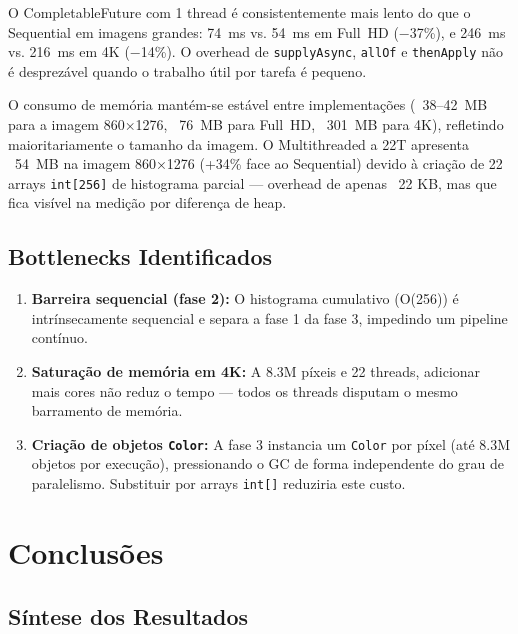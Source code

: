 \documentclass[a4paper,11pt,openright,BCOR=15mm]{scrbook}
\begin{document}
O CompletableFuture com 1 thread é consistentemente mais lento do que o Sequential em imagens grandes: 74~ms vs. 54~ms em Full~HD ($-$37\%), e 246~ms vs. 216~ms em 4K ($-$14\%). O overhead de \texttt{supplyAsync}, \texttt{allOf} e \texttt{thenApply} não é desprezável quando o trabalho útil por tarefa é pequeno.

O consumo de memória mantém-se estável entre implementações (~38--42~MB para a imagem 860×1276, ~76~MB para Full~HD, ~301~MB para 4K), refletindo maioritariamente o tamanho da imagem. O Multithreaded a 22T apresenta ~54~MB na imagem 860×1276 (+34\% face ao Sequential) devido à criação de 22 arrays \texttt{int[256]} de histograma parcial --- overhead de apenas ~22 KB, mas que fica visível na medição por diferença de heap.

\section{Bottlenecks Identificados}

\begin{enumerate}
    \item \textbf{Barreira sequencial (fase 2):} O histograma cumulativo (O(256)) é intrínsecamente sequencial e separa a fase 1 da fase 3, impedindo um pipeline contínuo.
    \item \textbf{Saturação de memória em 4K:} A 8.3M píxeis e 22 threads, adicionar mais cores não reduz o tempo --- todos os threads disputam o mesmo barramento de memória.
    \item \textbf{Criação de objetos \texttt{Color}:} A fase 3 instancia um \texttt{Color} por píxel (até 8.3M objetos por execução), pressionando o GC de forma independente do grau de paralelismo. Substituir por arrays \texttt{int[]} reduziria este custo.
\end{enumerate}

\chapter{Conclusões}

\section{Síntese dos Resultados}
\end{document}
